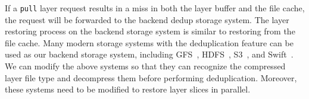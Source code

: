 If a \texttt{pull} layer request results in a miss in both the layer buffer and the file cache, 
the request will be forwarded to the backend dedup storage system.
The layer restoring process on the backend storage system is similar to restoring from the file cache.
Many modern storage systems with the deduplication feature can be used as our backend storage system, including GFS~\cite{ghemawat2003google}, HDFS~\cite{hdfs}, S3~\cite{s3}, and Swift~\cite{swift}.
We can modify the above systems so that they can recognize the compressed layer file type and decompress them before performing deduplication.
Moreover, these systems need to be modified to restore layer slices in parallel. 


